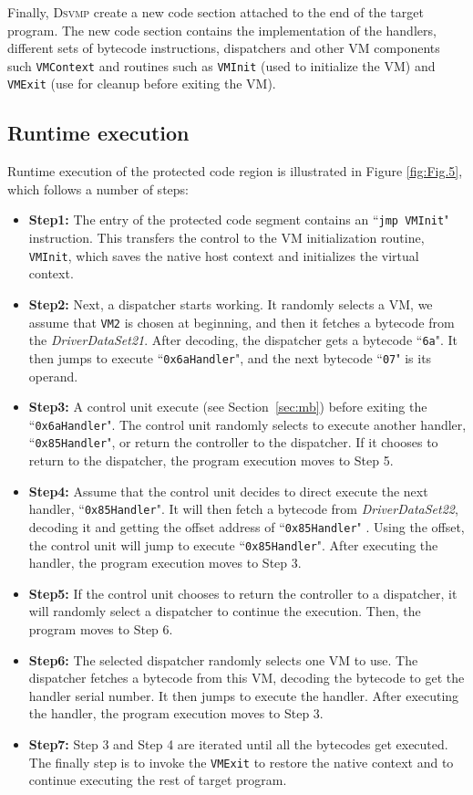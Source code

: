 \documentclass[preprint,12pt,3p]{elsarticle}
\newcommand{\DSVMP}{\textsc{Dsvmp }}
\begin{document}
Finally, \DSVMP create a new code section attached to the end of the target program.
The new code section contains the implementation of the handlers, different sets of bytecode instructions,
dispatchers and other VM components such \texttt{VMContext} and routines such as
\texttt{VMInit} (used to initialize the VM) and \texttt{VMExit} (use for cleanup before exiting the VM).



\subsection{Runtime execution}
Runtime execution of the protected code region is illustrated in Figure \ref{fig:Fig.5}, which follows a number of steps:
\begin{itemize}
\item \textbf{Step1:} The entry of the protected code segment contains an ``\texttt{jmp VMInit}" instruction. This transfers the control to the VM initialization routine, \texttt{VMInit}, which saves the native host context and initializes the virtual context.
\item \textbf{Step2:} Next, a dispatcher starts working. It randomly selects a VM, we assume that \texttt{VM2} is chosen at beginning, and then it fetches a bytecode from the \emph{DriverDataSet21}. After decoding, the dispatcher gets a bytecode ``\texttt{6a}". It then jumps to execute ``\texttt{0x6aHandler}", and the next bytecode ``\texttt{07}" is its operand.
\item \textbf{Step3:} A control unit execute (see Section~\ref{sec:mb}) before exiting the ``\texttt{0x6aHandler}". The control unit randomly selects to execute another handler, ``\texttt{0x85Handler}", or return the controller to the dispatcher. If it chooses to return to the dispatcher, the program execution moves to Step 5.
\item \textbf{Step4:} Assume that the control unit decides to direct execute the next handler, ``\texttt{0x85Handler}". It will then fetch a bytecode from \emph{DriverDataSet22}, decoding it and getting the offset address of ``\texttt{0x85Handler}" . Using the offset, the control unit will jump to execute ``\texttt{0x85Handler}". After executing the handler, the program execution moves to Step 3.
\item \textbf{Step5:} If the control unit chooses to return the controller to a dispatcher, it will randomly select a dispatcher to continue the execution. Then, the program moves to Step 6.
\item \textbf{Step6:} The selected dispatcher randomly selects one VM to use. The dispatcher fetches a bytecode from this VM, decoding the bytecode to get the handler serial number.
    It then jumps to execute the handler. After executing the handler, the program execution moves to Step 3.
\item \textbf{Step7:} Step 3 and Step 4 are iterated until all the bytecodes get executed. The finally step is to invoke the \texttt{VMExit} to restore the native context and to continue executing the rest of target program.
\end{itemize}
\end{document}
